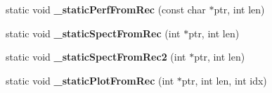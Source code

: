 \begin{DoxyCompactItemize}
\item 
\hypertarget{class_c_wavfrag_dlg_af00144bef8b61575180108b7b0a3b73d}{static void {\bfseries \-\_\-static\-Perf\-From\-Rec} (const char $\ast$ptr, int len)}\label{class_c_wavfrag_dlg_af00144bef8b61575180108b7b0a3b73d}

\item 
\hypertarget{class_c_wavfrag_dlg_a209b87c88890f6be3505d86231507363}{static void {\bfseries \-\_\-static\-Spect\-From\-Rec} (int $\ast$ptr, int len)}\label{class_c_wavfrag_dlg_a209b87c88890f6be3505d86231507363}

\item 
\hypertarget{class_c_wavfrag_dlg_ae25f0db0376a91c1fd0935ec63763e6e}{static void {\bfseries \-\_\-static\-Spect\-From\-Rec2} (int $\ast$ptr, int len)}\label{class_c_wavfrag_dlg_ae25f0db0376a91c1fd0935ec63763e6e}

\item 
\hypertarget{class_c_wavfrag_dlg_ac2036a99bc1287bd410e1fa3981a210f}{static void {\bfseries \-\_\-static\-Plot\-From\-Rec} (int $\ast$ptr, int len, int idx)}\label{class_c_wavfrag_dlg_ac2036a99bc1287bd410e1fa3981a210f}

\end{DoxyCompactItemize}
